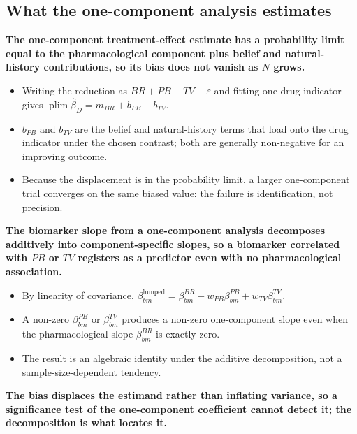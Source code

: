 \documentclass[
  11pt,
]{article}
\begin{document}
\subsection{What the one-component analysis estimates}\label{what-the-one-component-analysis-estimates}

\textbf{The one-component treatment-effect estimate has a probability limit equal to the pharmacological component plus belief and natural-history contributions, so its bias does not vanish as $N$ grows.}

\begin{itemize}\setlength{\itemsep}{2pt}\setlength{\parskip}{0pt}
\item Writing the reduction as $BR + PB + TV - \varepsilon$ and fitting one drug indicator gives $\operatorname{plim}\hat\beta_D = m_{BR} + b_{PB} + b_{TV}$.
\item $b_{PB}$ and $b_{TV}$ are the belief and natural-history terms that load onto the drug indicator under the chosen contrast; both are generally non-negative for an improving outcome.
\item Because the displacement is in the probability limit, a larger one-component trial converges on the same biased value: the failure is identification, not precision.
\end{itemize}

\textbf{The biomarker slope from a one-component analysis decomposes additively into component-specific slopes, so a biomarker correlated with $PB$ or $TV$ registers as a predictor even with no pharmacological association.}

\begin{itemize}\setlength{\itemsep}{2pt}\setlength{\parskip}{0pt}
\item By linearity of covariance, $\beta_{bm}^{\text{lumped}} = \beta_{bm}^{BR} + w_{PB}\beta_{bm}^{PB} + w_{TV}\beta_{bm}^{TV}$.
\item A non-zero $\beta_{bm}^{PB}$ or $\beta_{bm}^{TV}$ produces a non-zero one-component slope even when the pharmacological slope $\beta_{bm}^{BR}$ is exactly zero.
\item The result is an algebraic identity under the additive decomposition, not a sample-size-dependent tendency.
\end{itemize}

\textbf{The bias displaces the estimand rather than inflating variance, so a significance test of the one-component coefficient cannot detect it; the decomposition is what locates it.}
\end{document}
